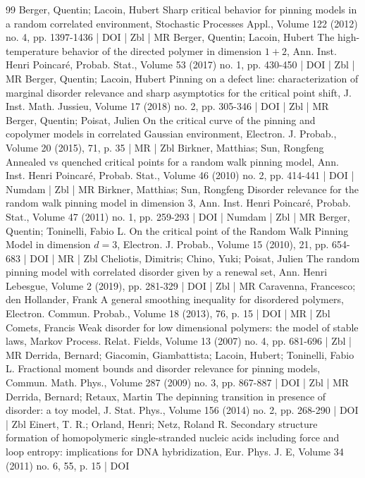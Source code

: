\documentclass[10pt]{amsart}
\theoremstyle{definition}\newtheorem{defi}[theo]{Definition}\newtheorem{rema}[theo]{Remark}\newtheorem{exam}[theo]{Example}\newtheorem{exem}[theo]{Example}\newtheorem{nota}[theo]{Notation}
\begin{document}
\begin{thebibliography}{99}
Berger, Quentin; Lacoin, Hubert Sharp critical behavior for pinning models in a random correlated environment, Stochastic Processes Appl., Volume 122 (2012) no. 4, pp. 1397-1436 | DOI | Zbl | MR
Berger, Quentin; Lacoin, Hubert The high-temperature behavior of the directed polymer in dimension $1+2$, Ann. Inst. Henri Poincaré, Probab. Stat., Volume 53 (2017) no. 1, pp. 430-450 | DOI | Zbl | MR
Berger, Quentin; Lacoin, Hubert Pinning on a defect line: characterization of marginal disorder relevance and sharp asymptotics for the critical point shift, J. Inst. Math. Jussieu, Volume 17 (2018) no. 2, pp. 305-346 | DOI | Zbl | MR
Berger, Quentin; Poisat, Julien On the critical curve of the pinning and copolymer models in correlated Gaussian environment, Electron. J. Probab., Volume 20 (2015), 71, p. 35 | MR | Zbl
Birkner, Matthias; Sun, Rongfeng Annealed vs quenched critical points for a random walk pinning model, Ann. Inst. Henri Poincaré, Probab. Stat., Volume 46 (2010) no. 2, pp. 414-441 | DOI | Numdam | Zbl | MR
Birkner, Matthias; Sun, Rongfeng Disorder relevance for the random walk pinning model in dimension 3, Ann. Inst. Henri Poincaré, Probab. Stat., Volume 47 (2011) no. 1, pp. 259-293 | DOI | Numdam | Zbl | MR
Berger, Quentin; Toninelli, Fabio L. On the critical point of the Random Walk Pinning Model in dimension $d=3$, Electron. J. Probab., Volume 15 (2010), 21, pp. 654-683 | DOI | MR | Zbl
Cheliotis, Dimitris; Chino, Yuki; Poisat, Julien The random pinning model with correlated disorder given by a renewal set, Ann. Henri Lebesgue, Volume 2 (2019), pp. 281-329 | DOI | Zbl | MR
Caravenna, Francesco; den Hollander, Frank A general smoothing inequality for disordered polymers, Electron. Commun. Probab., Volume 18 (2013), 76, p. 15 | DOI | MR | Zbl
Comets, Francis Weak disorder for low dimensional polymers: the model of stable laws, Markov Process. Relat. Fields, Volume 13 (2007) no. 4, pp. 681-696 | Zbl | MR
Derrida, Bernard; Giacomin, Giambattista; Lacoin, Hubert; Toninelli, Fabio L. Fractional moment bounds and disorder relevance for pinning models, Commun. Math. Phys., Volume 287 (2009) no. 3, pp. 867-887 | DOI | Zbl | MR
Derrida, Bernard; Retaux, Martin The depinning transition in presence of disorder: a toy model, J. Stat. Phys., Volume 156 (2014) no. 2, pp. 268-290 | DOI | Zbl
Einert, T. R.; Orland, Henri; Netz, Roland R. Secondary structure formation of homopolymeric single-stranded nucleic acids including force and loop entropy: implications for DNA hybridization, Eur. Phys. J. E, Volume 34 (2011) no. 6, 55, p. 15 | DOI

\end{thebibliography}
\end{document}
